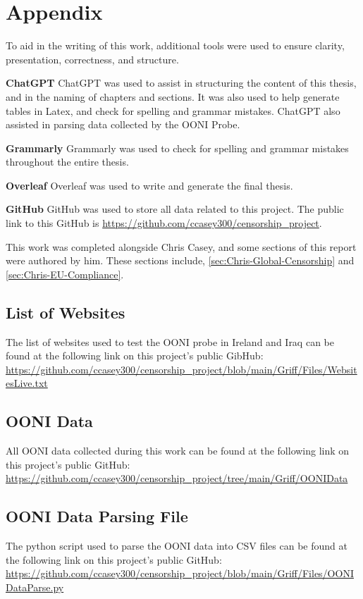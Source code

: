 \chapter{Appendix}

To aid in the writing of this work, additional tools were used to ensure clarity, presentation, correctness, and structure.

\textbf{ChatGPT} ChatGPT was used to assist in structuring the content of this thesis, and in the naming of chapters and sections. It was also used to help generate tables in Latex, and check for spelling and grammar mistakes. ChatGPT also assisted in parsing data collected by the OONI Probe.

\textbf{Grammarly} Grammarly was used to check for spelling and grammar mistakes throughout the entire thesis.

\textbf{Overleaf} Overleaf was used to write and generate the final thesis.

\textbf{GitHub} GitHub was used to store all data related to this project. The public link to this GitHub is \url{https://github.com/ccasey300/censorship_project}.

This work was completed alongside Chris Casey, and some sections of this report were authored by him. These sections include, \ref{sec:Chris-Global-Censorship} and \ref{sec:Chris-EU-Compliance}.

\section{List of Websites}

The list of websites used to test the OONI probe in Ireland and Iraq can be found at the following link on this project's public GibHub:
\url{https://github.com/ccasey300/censorship_project/blob/main/Griff/Files/WebsitesLive.txt}

\section{OONI Data}

All OONI data collected during this work can be found at the following link on this project's public GitHub:
\url{https://github.com/ccasey300/censorship_project/tree/main/Griff/OONIData}

\section{OONI Data Parsing File}

The python script used to parse the OONI data into CSV files can be found at the following link on this project's public GitHub:
\url{https://github.com/ccasey300/censorship_project/blob/main/Griff/Files/OONIDataParse.py}






